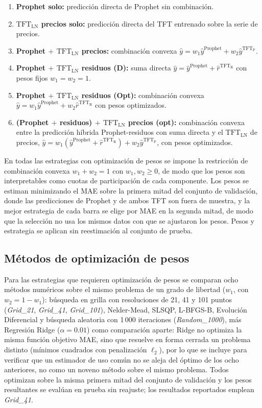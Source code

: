 \begin{enumerate}
    \item \textbf{Prophet solo:} predicción directa de Prophet sin combinación.
    \item \textbf{$\text{TFT}_\text{LN}$ precios solo:} predicción directa del TFT entrenado sobre la serie de precios.
    \item \textbf{Prophet $+$ $\text{TFT}_\text{LN}$ precios:} combinación convexa $\hat{y} = w_1 \hat{y}^{\text{Prophet}} + w_2 \hat{y}^{\text{TFT}_\text{P}}$.
    \item \textbf{Prophet $+$ $\text{TFT}_\text{LN}$ residuos (D):} suma directa $\hat{y} = \hat{y}^{\text{Prophet}} + \hat{r}^{\text{TFT}_\text{R}}$ con pesos fijos $w_1 = w_2 = 1$.
    \item \textbf{Prophet $+$ $\text{TFT}_\text{LN}$ residuos (Opt):} combinación convexa $\hat{y} = w_1 \hat{y}^{\text{Prophet}} + w_2 \hat{r}^{\text{TFT}_\text{R}}$ con pesos optimizados.
    \item \textbf{(Prophet $+$ residuos) $+$ $\text{TFT}_\text{LN}$ precios (opt):} combinación convexa entre la predicción híbrida Prophet-residuos con suma directa y el $\text{TFT}_\text{LN}$ de precios, $\hat{y} = w_1 (\hat{y}^{\text{Prophet}} + \hat{r}^{\text{TFT}_\text{R}}) + w_2 \hat{y}^{\text{TFT}_\text{P}}$, con pesos optimizados.
\end{enumerate}

En todas las estrategias con optimización de pesos se impone la restricción de combinación convexa $w_1 + w_2 = 1$ con $w_1, w_2 \geq 0$, de modo que los pesos son interpretables como cuotas de participación de cada componente. Los pesos se estiman minimizando el MAE sobre la primera mitad del conjunto de validación, donde las predicciones de Prophet y de ambos TFT son fuera de muestra, y la mejor estrategia de cada barra se elige por MAE en la segunda mitad, de modo que la selección no usa los mismos datos con que se ajustaron los pesos. Pesos y estrategia se aplican sin reestimación al conjunto de prueba.

\subsection{Métodos de optimización de pesos}

Para las estrategias que requieren optimización de pesos se comparan ocho métodos numéricos sobre el mismo problema de un grado de libertad ($w_1$, con $w_2 = 1 - w_1$): búsqueda en grilla con resoluciones de 21, 41 y 101 puntos (\textit{Grid\_21}, \textit{Grid\_41}, \textit{Grid\_101}), Nelder-Mead, SLSQP, L-BFGS-B, Evolución Diferencial y búsqueda aleatoria con 1\,000 iteraciones (\textit{Random\_1000}), más Regresión Ridge ($\alpha = 0.01$) como comparación aparte: Ridge no optimiza la misma función objetivo MAE, sino que resuelve en forma cerrada un problema distinto (mínimos cuadrados con penalización $\ell_2$), por lo que se incluye para verificar que un estimador de uso común no se aleja del óptimo de los ocho anteriores, no como un noveno método sobre el mismo problema. Todos optimizan sobre la misma primera mitad del conjunto de validación y los pesos resultantes se evalúan en prueba sin reajuste; los resultados reportados emplean \textit{Grid\_41}.

